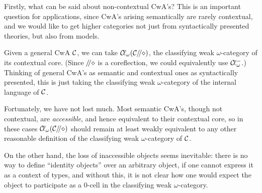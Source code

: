 \begin{para}Firstly, what can be said about non-contextual CwA's?  This is an important question for applications, since CwA's arising semantically are rarely contextual, and we would like to get higher categories not just from syntactically presented theories, but also from models.

Given a general CwA $\mathcal{C}$, we can take $\mathcal{C}\! \ell_\omega(\mathcal{C} \!\!\; / \!\!\!\; / \diamond)$, the classifying weak $\omega$-category of its contextual core.  (Since $\!\!\; / \!\!\!\; / \diamond$ is a coreflection, we could equivalently use $\mathcal{C}\! \ell_\omega^-$.)  Thinking of general CwA's as semantic and contextual ones as syntactically presented, this is just taking the classifying weak $\omega$-category of the internal language of $\mathcal{C}$.

Fortunately, we have not lost much.  Most semantic CwA's, though not contextual, are \emph{accessible}, and hence equivalent to their contextual core, so in these cases $\mathcal{C}\! \ell_\omega(\mathcal{C} \!\!\; / \!\!\!\; / \diamond)$ should remain at least weakly equivalent to any other reasonable definition of the classifying weak $\omega$-category of $\mathcal{C}$.

On the other hand, the loss of inaccessible objects seems inevitable: there is no way to define ``identity objects'' over an arbitrary object, if one cannot express it as a context of types, and without this, it is not clear how one would expect the object to participate as a 0-cell in the classifying weak $\omega$-category.
\end{para}


